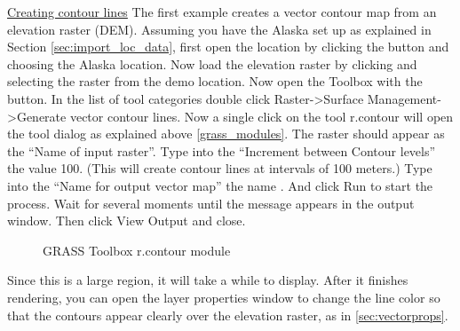 \underline{Creating contour lines}\linebreak 
The first example creates a vector contour map from an elevation raster (DEM).  Assuming you have the Alaska  set up as explained in Section \ref{sec:import_loc_data}, first open the location by clicking the   button and choosing the Alaska location. Now load the  elevation raster by clicking  and selecting the  raster from the demo location.  Now open the Toolbox with the  button.  In the list of tool categories double click Raster->Surface Management->Generate vector contour lines. Now a single click on the tool r.contour will open the tool dialog as explained above \ref{grass_modules}.
The  raster should appear as the ``Name of input raster''. Type into the ``Increment between Contour levels'' the value 100. (This will create contour lines at intervals of 100 meters.) Type into the ``Name for output vector map'' the name . And click Run to start the process. Wait for several moments until the message  appears in the output window. Then click View Output and close. 
\begin{figure}[h]
\centering
\caption{GRASS Toolbox r.contour module \nixcaption}\label{fig:grass_toolbox_rcontour}
   \goodgap
   \goodgap

\end{figure}
Since this is a large region, it will take a while to display. After it finishes rendering, you can open the layer properties window to change the line color so that the contours appear clearly over the elevation raster, as in \ref{sec:vectorprops}.

